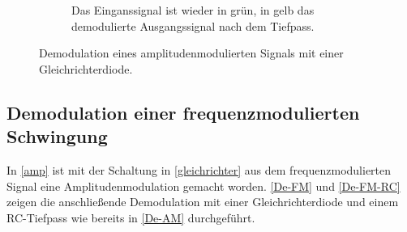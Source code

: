 \begin{figure}[t!]
\begin{subfigure}[t]{0.48\textwidth}
		\caption{Das Einganssignal ist wieder in grün, in gelb das demodulierte Ausgangssignal nach dem Tiefpass.}
		\label{nachRC}
	\end{subfigure}
	\caption{Demodulation eines amplitudenmodulierten Signals mit einer Gleichrichterdiode.}
\end{figure}

\subsection{Demodulation einer frequenzmodulierten Schwingung}

In \autoref{amp} ist mit der Schaltung in \autoref{gleichrichter} aus dem frequenzmodulierten Signal eine Amplitudenmodulation gemacht worden. \autoref{De-FM} und \autoref{De-FM-RC} zeigen die anschließende Demodulation mit einer Gleichrichterdiode und einem RC-Tiefpass wie bereits in \autoref{De-AM} durchgeführt.

